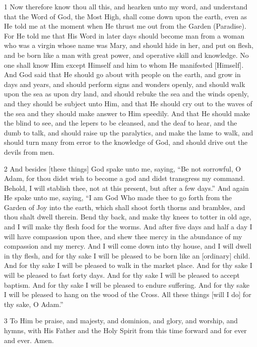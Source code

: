 \par 1 Now therefore know thou all this, and hearken unto my word, and understand that the Word of God, the Most High, shall come down upon the earth, even as He told me at the moment when He thrust me out from the Garden (Paradise). For He told me that His Word in later days should become man from a woman who was a virgin whose name was Mary, and should hide in her, and put on flesh, and be born like a man with great power, and operative skill and knowledge. No one shall know Him except Himself and him to whom He manifested [Himself]. And God said that He should go about with people on the earth, and grow in days and years, and should perform signs and wonders openly, and should walk upon the sea as upon dry land, and should rebuke the sea and the winds openly, and they should be subject unto Him, and that He should cry out to the waves of the sea and they should make answer to Him speedily. And that He should make the blind to see, and the lepers to be cleansed, and the deaf to hear, and the dumb to talk, and should raise up the paralytics, and make the lame to walk, and should turn many from error to the knowledge of God, and should drive out the devils from men.

\par 2 And besides [these things] God spake unto me, saying, “Be not sorrowful, O Adam, for thou didst wish to become a god and didst transgress my command. Behold, I will stablish thee, not at this present, but after a few days.” And again He spake unto me, saying, “I am God Who made thee to go forth from the Garden of Joy into the earth, which shall shoot forth thorns and brambles, and thou shalt dwell therein. Bend thy back, and make thy knees to totter in old age, and I will make thy flesh food for the worms. And after five days and half a day I will have compassion upon thee, and shew thee mercy in the abundance of my compassion and my mercy. And I will come down into thy house, and I will dwell in thy flesh, and for thy sake I will be pleased to be born like an [ordinary] child. And for thy sake I will be pleased to walk in the market place. And for thy sake I will be pleased to fast forty days. And for thy sake I will be pleased to accept baptism. And for thy sake I will be pleased to endure suffering. And for thy sake I will be pleased to hang on the wood of the Cross. All these things [will I do] for thy sake, O Adam.”

\par 3 To Him be praise, and majesty, and dominion, and glory, and worship, and hymns, with His Father and the Holy Spirit from this time forward and for ever and ever. Amen.

